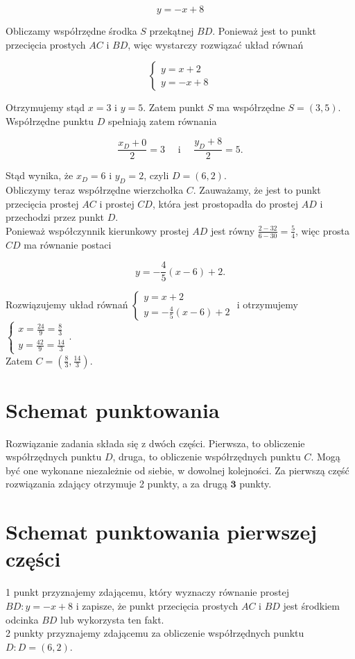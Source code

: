 \documentclass[10pt]{article}
\begin{document}
$$
y=-x+8
$$

Obliczamy współrzędne środka $S$ przekątnej $B D$. Ponieważ jest to punkt przecięcia prostych $A C$ i $B D$, więc wystarczy rozwiązać układ równań

$$
\left\{\begin{array}{l}
y=x+2 \\
y=-x+8
\end{array}\right.
$$

Otrzymujemy stąd $x=3$ i $y=5$. Zatem punkt $S$ ma współrzędne $S=(3,5)$. Współrzędne punktu $D$ spełniają zatem równania

$$
\frac{x_{D}+0}{2}=3 \quad \text { i } \quad \frac{y_{D}+8}{2}=5 .
$$

Stąd wynika, że $x_{D}=6$ i $y_{D}=2$, czyli $D=(6,2)$.\\
Obliczymy teraz współrzędne wierzchołka $C$. Zauważamy, że jest to punkt przecięcia prostej $A C$ i prostej $C D$, która jest prostopadła do prostej $A D$ i przechodzi przez punkt $D$.\\
Ponieważ współczynnik kierunkowy prostej $A D$ jest równy $\frac{2-32}{6-30}=\frac{5}{4}$, więc prosta $C D$ ma równanie postaci

$$
y=-\frac{4}{5}(x-6)+2 .
$$

Rozwiązujemy układ równań $\left\{\begin{array}{l}y=x+2 \\ y=-\frac{4}{5}(x-6)+2\end{array}\right.$ i otrzymujemy $\left\{\begin{array}{l}x=\frac{24}{9}=\frac{8}{3} \\ y=\frac{42}{9}=\frac{14}{3}\end{array}\right.$.\\
Zatem $C=\left(\frac{8}{3}, \frac{14}{3}\right)$.

\section*{Schemat punktowania}
Rozwiązanie zadania składa się z dwóch części. Pierwsza, to obliczenie współrzędnych punktu $D$, druga, to obliczenie współrzędnych punktu $C$. Mogą być one wykonane niezależnie od siebie, w dowolnej kolejności. Za pierwszą część rozwiązania zdający otrzymuje 2 punkty, a za drugą $\mathbf{3}$ punkty.

\section*{Schemat punktowania pierwszej części}
1 punkt przyznajemy zdającemu, który wyznaczy równanie prostej $B D: y=-x+8$ i zapisze, że punkt przecięcia prostych $A C$ i $B D$ jest środkiem odcinka $B D$ lub wykorzysta ten fakt.\\
2 punkty przyznajemy zdającemu za obliczenie współrzędnych punktu $D: D=(6,2)$.
\end{document}
